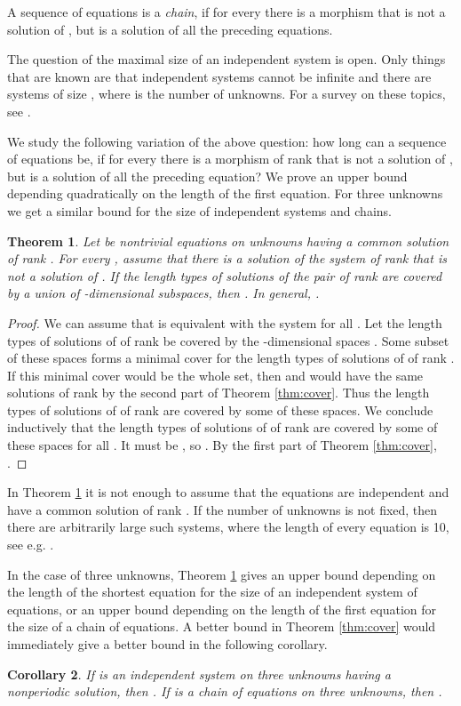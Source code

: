 \documentclass[submission]{eptcs}
\newtheorem{theorem}{Theorem}[section]
\newtheorem{corollary}[theorem]{Corollary}
\theoremstyle{definition}
\begin{document}
A sequence of equations  is a \emph{chain}, if for
every  there is a morphism that is not a solution of , but
is a solution of all the preceding equations.

The question of the maximal size of an independent system is open.
Only things that are known are that independent systems cannot be
infinite and there are systems of size , where  is
the number of unknowns. For a survey on these topics, see
\cite{KaSa11}.

We study the following variation of the above question: how long can
a sequence of equations  be, if for every  there
is a morphism of rank  that is not a solution of , but is
a solution of all the preceding equation? We prove an upper bound
depending quadratically on the length of the first equation. For
three unknowns we get a similar bound for the size of independent
systems and chains.

\begin{theorem} \label{thm:chain}
Let  be nontrivial equations on  unknowns having
a common solution of rank . For every , assume that there is a solution of the system  of rank  that is not a solution of . If the
length types of solutions of the pair  of rank  are
covered by a union of  -dimensional subspaces, then . In general, .
\end{theorem}
\begin{proof}
We can assume that  is equivalent with the system  for all . Let the length types of
solutions of  of rank  be covered by the
-dimensional spaces . Some subset of these
spaces forms a minimal cover for the length types of solutions of
 of rank . If this minimal cover would be the whole set,
then  and  would have the same solutions of rank  by
the second part of Theorem \ref{thm:cover}. Thus the length types of
solutions of  of rank  are covered by some  of these
spaces. We conclude inductively that the length types of solutions
of  of rank  are covered by some  of these spaces
for all . It must be , so . By the first part of Theorem \ref{thm:cover}, .
\end{proof}

In Theorem \ref{thm:chain} it is not enough to assume that the
equations are independent and have a common solution of rank .
If the number of unknowns is not fixed, then there are arbitrarily
large such systems, where the length of every equation is 10, see
e.g. \cite{HaKaPl02}.

In the case of three unknowns, Theorem \ref{thm:chain} gives an
upper bound depending on the length of the shortest equation for the
size of an independent system of equations, or an upper bound
depending on the length of the first equation for the size of a
chain of equations. A better bound in Theorem \ref{thm:cover} would
immediately give a better bound in the following corollary.

\begin{corollary}
If  is an independent system on three unknowns
having a nonperiodic solution, then . If  is a chain of equations on three unknowns, then .
\end{corollary}



\end{document}
